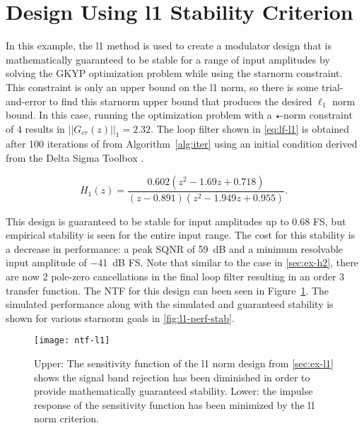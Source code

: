 \section{Design Using \gls{l1} Stability Criterion}
\label{sec:ex-l1}

In this example, the \gls{l1} method is used to create a modulator design that is mathematically guaranteed to be stable for a range of input amplitudes by solving the \gls{GKYP} optimization problem while using the \gls{starnorm} constraint. This constraint is only an upper bound on the \gls{l1} norm, so there is some trial-and-error to find this \gls{starnorm} upper bound that produces the desired $\ell_1$ norm bound. In this case, running the optimization problem with a $\star$-norm constraint of $4$ results in $||G_{er}(z)||_1 = 2.32$. The loop filter shown in \autoref{eq:lf-l1} is obtained after 100 iterations of  from Algorithm~\ref{alg:iter} using an initial condition derived from the Delta Sigma Toolbox \cite[Appx. B]{Schreier1997}.

\begin{equation} \label{eq:lf-l1}
	H_1(z) = \frac{0.602\left(z^2 - 1.69z + 0.718\right)}{\left(z - 0.891\right)\left(z^2 - 1.949z + 0.955\right)}.
\end{equation}

This design is guaranteed to be stable for input amplitudes up to 0.68 \gls{FS}, but empirical stability is seen for the entire input range. The cost for this stability is a decrease in performance: a peak \gls{SQNR} of \SI{59}{\deci\bel} and a minimum resolvable input amplitude of \SI{-41}{\deci\bel} FS. Note that similar to the case in \autoref{sec:ex-h2}, there are now 2 pole-zero cancellations in the final loop filter resulting in an order 3 transfer function. The \gls{NTF} for this design can been seen in Figure~\ref{fig:ntf-l1}. The simulated performance along with the simulated and guaranteed stability is shown for various \gls{starnorm} goals in \autoref{fig:l1-perf-stab}.

\begin{figure}
	\centering
	\texttt{[image: ntf-l1]}
	\caption{Upper: The sensitivity function of the \gls{l1} norm design from \autoref{sec:ex-l1} shows the signal band rejection has been diminished in order to provide mathematically guaranteed stability. Lower: the impulse response of the sensitivity function has been minimized by the \gls{l1} norm criterion.} \label{fig:ntf-l1}
\end{figure}

